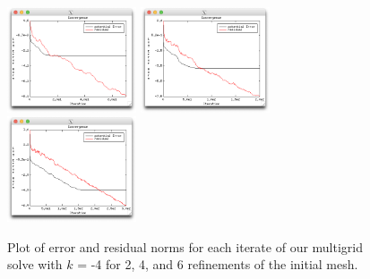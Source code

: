 \begin{refsection}
\begin{figure}
\centering
\includegraphics[width=1.5in]{figures/errorAnisoK4_r2.png}\hfil
\includegraphics[width=1.5in]{figures/errorAnisoK4_r4.png}\hfil
\includegraphics[width=1.5in]{figures/errorAnisoK4_r6.png}
\caption{Plot of error and residual norms for each iterate of our multigrid solve with $k$ = -4 for 2, 4, and 6 refinements of the initial mesh.\label{fig:errorAnisoN}}
\end{figure}


\end{refsection}
